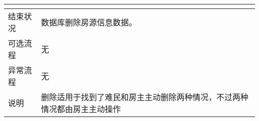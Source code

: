 \begin{table}[htbp]
\begin{tabular}{|l|l|l|l|}
{        }                                                                                                                                                                                                         \\
        \hline
        结束状况                          & \multicolumn{3}{l|}{数据库删除房源信息数据。    }                                                                                                                     \\
        \hline
        可选流程                          & \multicolumn{3}{l|}{无}                                                                                                                                               \\
        \hline
        异常流程                          & \multicolumn{3}{l|}{无}                                                                                                                                               \\
        \hline
        说明                              & \multicolumn{3}{l|}{
        \begin{minipage}[t]{0.8\textwidth}
                删除适用于找到了难民和房主主动删除两种情况，不过两种情况都由房主主动操作
                \vspace{0.5em}
            \end{minipage}   }                                                                                                                                                                            \\
        \hline
    \end{tabular}
\end{table}

